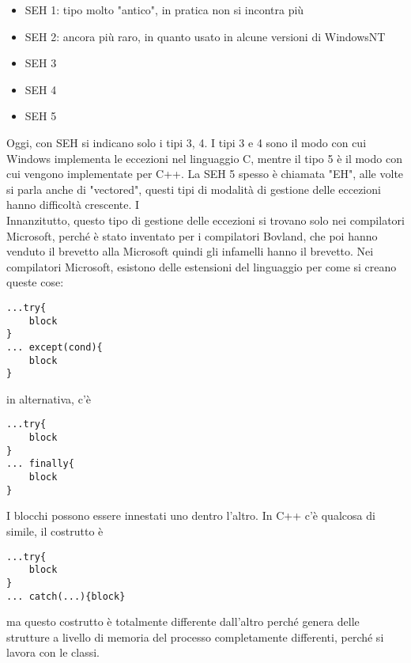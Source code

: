 \documentclass[12pt, oneside]{extbook}
\begin{document}
\begin{itemize}
\item SEH 1: tipo molto "antico", in pratica non si incontra più
\item SEH 2: ancora più raro, in quanto usato in alcune versioni di WindowsNT
\item SEH 3
\item SEH 4
\item SEH 5
\end{itemize}
Oggi, con SEH si indicano solo i tipi 3, 4. I tipi 3 e 4 sono il modo con cui Windows implementa le eccezioni nel linguaggio C, mentre il tipo 5 è il modo con cui vengono implementate per C++. La SEH 5 spesso è chiamata "EH", alle volte si parla anche di "vectored", questi tipi di modalità di gestione delle eccezioni hanno difficoltà crescente.
I\\Innanzitutto, questo tipo di gestione delle eccezioni si trovano solo nei compilatori Microsoft, perché è stato inventato per i compilatori Bovland, che poi hanno venduto il brevetto alla Microsoft quindi gli infamelli hanno il brevetto. Nei compilatori Microsoft, esistono delle estensioni del linguaggio per come si creano queste cose:
\begin{lstlisting}
...try{
	block
}
... except(cond){
	block
}
\end{lstlisting}
in alternativa, c'è 
\begin{lstlisting}
...try{
	block
}
... finally{
	block
}
\end{lstlisting}
I blocchi possono essere innestati uno dentro l'altro. In C++ c'è qualcosa di simile, il costrutto è 
\begin{lstlisting}
...try{
	block
}
... catch(...){block}
\end{lstlisting}
ma questo costrutto è totalmente differente dall'altro perché genera delle strutture a livello di memoria del processo completamente differenti, perché si lavora con le classi.\\
\end{document}

